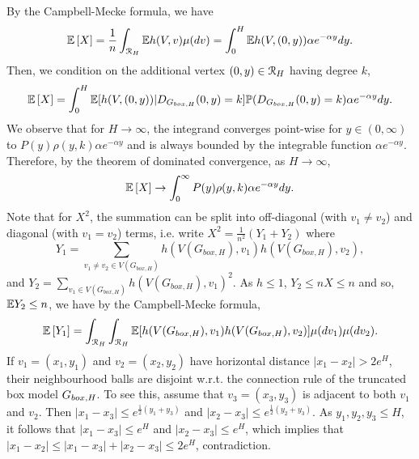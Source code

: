 By the Campbell-Mecke formula, we have
\begin{align*}
\mathbb{E}\left[ X\right] = \frac{1}{n}\int_{{\mathcal R}_H} \mathbb{E} h(V,v) \mu(dv) = \int_0^H \mathbb{E} h(V,(0,y))\alpha e^{-\alpha y} dy.
\end{align*}
Then, we condition on the additional vertex $(0,y) \in {\mathcal R}_H$ having degree $k$,
\begin{align*}
\mathbb{E}\left[ X\right] = \int_0^H \mathbb{E}[h(V,(0,y))|D_{G_{box,H}}(0,y)=k]\mathbb{P}(D_{G_{box,H}}(0,y)=k)\alpha e^{-\alpha y}dy.
\end{align*}
We observe that for $H \rightarrow \infty$, the integrand converges point-wise for $y \in (0,\infty)$ to $P(y)\rho(y,k)\alpha e^{-\alpha y}$ and is always bounded by the integrable function $\alpha e^{-\alpha y}$.
Therefore, by the theorem of dominated convergence, as $H \rightarrow \infty$,
\begin{align*}
\mathbb{E}\left[X\right] \rightarrow \int_0^\infty P(y)\rho(y,k)\alpha e^{-\alpha y}dy.
\end{align*}
Note that for $X^2$, the summation can be split into off-diagonal (with $v_1 \not = v_2$) and diagonal (with $v_1=v_2$) terms, i.e. write $X^2 = \frac{1}{n^2}(Y_1+Y_2)$ where 
\[
	Y_1 = \sum_{v_1 \not = v_2 \in V(G_{box,H})} h(V(G_{box,H}),v_1)h(V(G_{box,H}),v_2),
\] 
and $Y_2 = \sum_{v_1 \in V(G_{box,H})} h(V(G_{box,H}),v_1)^2$. As $h \leq 1$, $Y_2 \leq n X\leq n$ and so, $\mathbb{E} Y_2 \leq n$, we have by the Campbell-Mecke formula,
\begin{align*}
\mathbb{E}\left[Y_1\right] = \int_{{\mathcal R}_H} \int_{{\mathcal R}_H} \mathbb{E}[h(V(G_{box,H}),v_1)h(V(G_{box,H}),v_2)]\mu(dv_1)\mu(dv_2).
\end{align*}
If $v_1=(x_1,y_1)$ and $v_2=(x_2,y_2)$ have horizontal distance $|x_1-x_2|>2e^H$, their neighbourhood balls are disjoint w.r.t. the connection rule of the truncated box model $G_{box,H}$. To see this, assume that $v_3=(x_3,y_3)$ is adjacent to both $v_1$ and $v_2$. Then $|x_1-x_3|\leq e^{\frac{1}{2}(y_1+y_3)}$ and $|x_2-x_3|\leq e^{\frac{1}{2}(y_2+y_3)}$. As $y_1, y_2, y_3 \leq H$, it follows that $|x_1-x_3| \leq e^H$ and $|x_2-x_3|\leq e^H$, which implies that $|x_1-x_2| \leq |x_1-x_3|+|x_2-x_3|\leq 2e^H$, contradiction.

